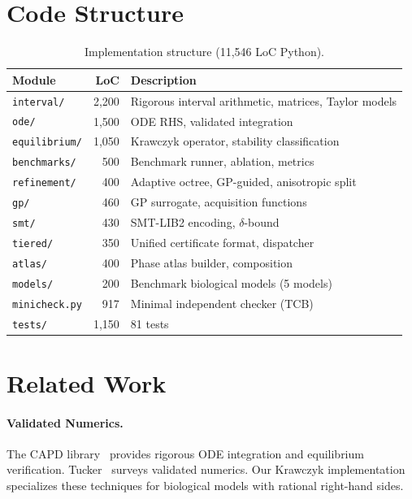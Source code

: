 \documentclass[11pt]{article}
\begin{document}
\section{Code Structure}
\label{sec:code}

\begin{table}[t]
\centering
\caption{Implementation structure (11,546 LoC Python).}
\label{tab:code}
\small
\begin{tabular}{@{}lrl@{}}
\toprule
Module & LoC & Description \\
\midrule
\texttt{interval/}    & 2,200 & Rigorous interval arithmetic, matrices, Taylor models \\
\texttt{ode/}          & 1,500 & ODE RHS, validated integration \\
\texttt{equilibrium/}  & 1,050 & Krawczyk operator, stability classification \\
\texttt{benchmarks/}   & 500   & Benchmark runner, ablation, metrics \\
\texttt{refinement/}   & 400   & Adaptive octree, GP-guided, anisotropic split \\
\texttt{gp/}           & 460   & GP surrogate, acquisition functions \\
\texttt{smt/}          & 430   & SMT-LIB2 encoding, $\delta$-bound \\
\texttt{tiered/}       & 350   & Unified certificate format, dispatcher \\
\texttt{atlas/}        & 400   & Phase atlas builder, composition \\
\texttt{models/}       & 200   & Benchmark biological models (5 models) \\
\texttt{minicheck.py}  & 917   & Minimal independent checker (TCB) \\
\texttt{tests/}        & 1,150 & 81 tests \\
\bottomrule
\end{tabular}
\end{table}

\section{Related Work}
\label{sec:related}

\paragraph{Validated Numerics.}
The CAPD library~\cite{kapela2021capd} provides rigorous ODE integration and equilibrium verification.
Tucker~\cite{tucker2011validated} surveys validated numerics.
Our Krawczyk implementation specializes these techniques for biological models with rational right-hand sides.
\end{document}
